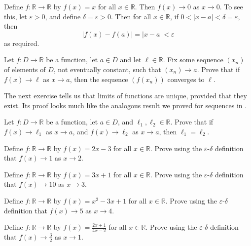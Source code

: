 \begin{example}
Define $f : \mathbb{R} \to \mathbb{R}$ by $f(x) = x$ for all $x \in \mathbb{R}$. Then $f(x) \to 0$ as $x \to 0$. To see this, let $\varepsilon > 0$, and define $\delta = \varepsilon > 0$. Then for all $x \in \mathbb{R}$, if $0 < |x-a| < \delta = \varepsilon$, then
\[ |f(x) - f(a)| = |x-a| < \varepsilon \]
as required.
\end{example}

\begin{exercise}
Let $f : D \to \mathbb{R}$ be a function, let $a \in D$ and let $\ell \in \mathbb{R}$. Fix some sequence $(x_n)$ of elements of $D$, not eventually constant, such that $(x_n) \to a$. Prove that if $f(x) \to \ell$ as $x \to a$, then the sequence $(f(x_n))$ converges to $\ell$.
\end{exercise}

The next exercise tells us that limits of functions are unique, provided that they exist. Its proof looks much like the analogous result we proved for sequences in .

\begin{exercise}
\label{exLimitsOfFunctionsAreUnique}
Let $f : D \to \mathbb{R}$ be a function, let $a \in D$, and $\ell_1, \ell_2 \in \mathbb{R}$. Prove that if $f(x) \to \ell_1$ as $x \to a$, and $f(x) \to \ell_2$ as $x \to a$, then $\ell_1=\ell_2$.
\end{exercise}

\begin{exercise}
Define $f: \mathbb{R} \to \mathbb{R}$ by $f(x) = 2x - 3$ for all $x \in \mathbb{R}$. Prove using the $\varepsilon$-$\delta$ definition that $f(x) \to 1$ as $x \to 2$.
\end{exercise}

\begin{exercise}
Define $f: \mathbb{R} \to \mathbb{R}$ by $f(x) = 3x + 1$ for all $x \in \mathbb{R}$. Prove using the $\varepsilon$-$\delta$ definition that $f(x) \to 10$ as $x \to 3$.
\end{exercise}

\begin{exercise}
Define $f: \mathbb{R} \to \mathbb{R}$ by $f(x) = x^2 - 3x + 1$ for all $x \in \mathbb{R}$. Prove using the $\varepsilon$-$\delta$ definition that $f(x) \to 5$ as $x \to 4$.
\end{exercise}

\begin{exercise}
Define $f: \mathbb{R} \to \mathbb{R}$ by $f(x) = \frac{2x + 1}{4x - 2}$ for all $x \in \mathbb{R}$. Prove using the $\varepsilon$-$\delta$ definition that $f(x) \to \frac{3}{2}$ as $x \to 1$.
\end{exercise}


